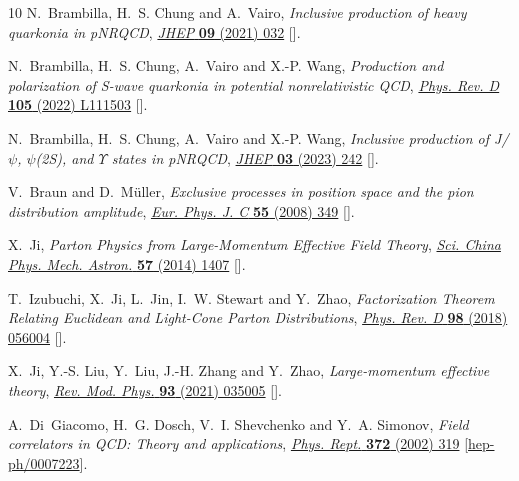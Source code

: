 \begin{thebibliography}{10}
N.~Brambilla, H.~S. Chung and A.~Vairo, \emph{{Inclusive production of heavy
  quarkonia in pNRQCD}},
  \href{https://doi.org/10.1007/JHEP09(2021)032}{\emph{JHEP} {\bfseries 09}
  (2021) 032} [\href{https://arxiv.org/abs/2106.09417}{{}}].

N.~Brambilla, H.~S. Chung, A.~Vairo and X.-P. Wang, \emph{{Production and
  polarization of S-wave quarkonia in potential nonrelativistic QCD}},
  \href{https://doi.org/10.1103/PhysRevD.105.L111503}{\emph{Phys. Rev. D}
  {\bfseries 105} (2022) L111503}
  [\href{https://arxiv.org/abs/2203.07778}{{}}].

N.~Brambilla, H.~S. Chung, A.~Vairo and X.-P. Wang, \emph{{Inclusive production
  of J/\ensuremath{\psi}, \ensuremath{\psi}(2S), and \ensuremath{\Upsilon}
  states in pNRQCD}},
  \href{https://doi.org/10.1007/JHEP03(2023)242}{\emph{JHEP} {\bfseries 03}
  (2023) 242} [\href{https://arxiv.org/abs/2210.17345}{{}}].

V.~Braun and D.~M\"uller, \emph{{Exclusive processes in position space and the
  pion distribution amplitude}},
  \href{https://doi.org/10.1140/epjc/s10052-008-0608-4}{\emph{Eur. Phys. J. C}
  {\bfseries 55} (2008) 349} [\href{https://arxiv.org/abs/0709.1348}{{}}].

X.~Ji, \emph{{Parton Physics from Large-Momentum Effective Field Theory}},
  \href{https://doi.org/10.1007/s11433-014-5492-3}{\emph{Sci. China Phys. Mech.
  Astron.} {\bfseries 57} (2014) 1407}
  [\href{https://arxiv.org/abs/1404.6680}{{}}].

T.~Izubuchi, X.~Ji, L.~Jin, I.~W. Stewart and Y.~Zhao, \emph{{Factorization
  Theorem Relating Euclidean and Light-Cone Parton Distributions}},
  \href{https://doi.org/10.1103/PhysRevD.98.056004}{\emph{Phys. Rev. D}
  {\bfseries 98} (2018) 056004}
  [\href{https://arxiv.org/abs/1801.03917}{{}}].

X.~Ji, Y.-S. Liu, Y.~Liu, J.-H. Zhang and Y.~Zhao, \emph{{Large-momentum
  effective theory}},
  \href{https://doi.org/10.1103/RevModPhys.93.035005}{\emph{Rev. Mod. Phys.}
  {\bfseries 93} (2021) 035005}
  [\href{https://arxiv.org/abs/2004.03543}{{}}].

A.~Di~Giacomo, H.~G. Dosch, V.~I. Shevchenko and Y.~A. Simonov, \emph{{Field
  correlators in QCD: Theory and applications}},
  \href{https://doi.org/10.1016/S0370-1573(02)00140-0}{\emph{Phys. Rept.}
  {\bfseries 372} (2002) 319}
  [\href{https://arxiv.org/abs/hep-ph/0007223}{{\ttfamily hep-ph/0007223}}].


\end{thebibliography}

